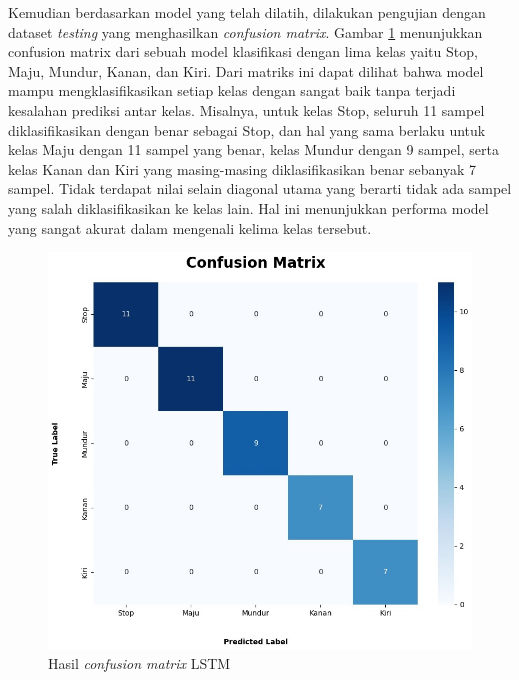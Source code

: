 Kemudian berdasarkan model yang telah dilatih, dilakukan pengujian dengan dataset \emph{testing} yang menghasilkan \emph{confusion matrix}.
Gambar \ref{fig:Grafik confusion matrix lstm} menunjukkan confusion matrix dari sebuah model klasifikasi dengan lima kelas yaitu Stop, Maju, Mundur, Kanan, dan Kiri. Dari matriks ini dapat dilihat bahwa model mampu
mengklasifikasikan setiap kelas dengan sangat baik tanpa terjadi kesalahan prediksi antar kelas. Misalnya, untuk kelas Stop, seluruh 11 sampel diklasifikasikan dengan benar sebagai Stop, 
dan hal yang sama berlaku untuk kelas Maju dengan 11 sampel yang benar, kelas Mundur dengan 9 sampel, serta kelas Kanan dan Kiri yang masing-masing diklasifikasikan benar sebanyak 7 sampel. 
Tidak terdapat nilai selain diagonal utama yang berarti tidak ada sampel yang salah diklasifikasikan ke kelas lain. Hal ini menunjukkan performa model yang sangat akurat dalam mengenali kelima kelas tersebut. 
\begin{figure} [H] \centering
  \includegraphics[scale=0.5]{gambar/confusion matrix lstm.jpg}
  \caption{Hasil \emph{confusion matrix} LSTM}
  \label{fig:Grafik confusion matrix lstm}
\end{figure}

